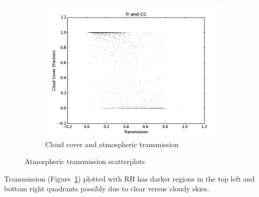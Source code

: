 \documentclass[a4paper,titlepage, twoside]{report}
\begin{document}
\begin{figure}
\begin{subfigure}{0.48\textwidth}
\includegraphics[width=\textwidth]{020_Tr_CC.png}
\caption{Cloud cover and atmospheric transmission}
\end{subfigure}
\caption{Atmospheric transmission scatterplots}
\label{fig:data-6}
\end{figure}

Transmission (Figure~\ref{fig:data-6}) plotted with RH has darker regions in the top left and bottom right quadrants possibly due to clear versus cloudy skies.
\end{document}
